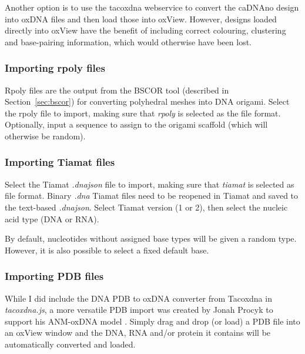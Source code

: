 Another option is to use the tacoxdna webservice to convert the caDNAno design into oxDNA files and then load those into oxView. However, designs loaded directly into oxView have the benefit of including correct colouring, clustering and base-pairing information, which would otherwise have been lost.

\subsubsection{Importing rpoly files}
Rpoly files are the output from the BSCOR \cite{vHelix} tool (described in Section~\ref{sec:bscor}) for converting polyhedral meshes into DNA origami.
Select the rpoly file to import, making sure that \emph{rpoly} is selected as the file format. Optionally, input a sequence to assign to the origami scaffold (which will otherwise be random).

\subsubsection{Importing Tiamat files}
Select the Tiamat \emph{.dnajson} file to import, making sure that \emph{tiamat} is selected as file format. Binary \emph{.dna} Tiamat files need to be reopened in Tiamat and saved to the text-based \emph{.dnajson}. Select Tiamat version (1 or 2), then select the nucleic acid type (DNA or RNA).

By default, nucleotides without assigned base types will be given a random type. However, it is also possible to select a fixed default base.

\subsubsection{Importing PDB files}
While I did include the DNA PDB to oxDNA converter from Tacoxdna in \emph{tacoxdna.js}, a more versatile PDB import was created by Jonah Procyk to support his ANM-oxDNA model \cite{procyk2021coarse}. Simply drag and drop (or load) a PDB file into an oxView window and the DNA, RNA and/or protein it contains will be automatically converted and loaded.


